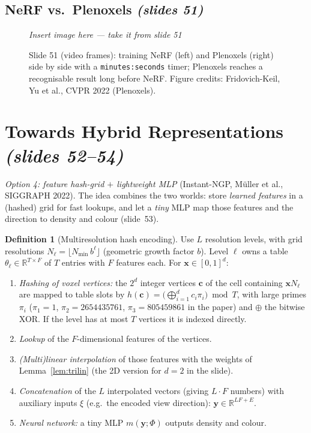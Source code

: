 \documentclass[11pt,a4paper]{article}
\newcommand{\R}{\mathbb{R}}
\newcommand{\xx}{\boldsymbol{x}}
\newcommand{\sref}[1]{\texorpdfstring{\emph{(slides #1)}}{(slides #1)}}
\theoremstyle{definition}
\newtheorem{definition}{Definition}[section]
\theoremstyle{plain}
\newcommand{\slideimg}[3]{%
\begin{figure}[H]
\centering
\begin{tcolorbox}[enhanced,colback=white,colframe=white,boxrule=0pt,sharp corners,overlay={\draw[dashed,gray,thick] (frame.south west) rectangle (frame.north east);},
  width=0.92\linewidth,height=#2,valign=center,halign=center]
{\color{gray}\itshape Insert image here --- take it from slide #1}
\end{tcolorbox}
\caption{#3}
\end{figure}}
\begin{document}
\subsection{NeRF vs.\ Plenoxels \sref{51}}

\slideimg{51}{4.8cm}{Slide 51 (video frames): training NeRF (left) and Plenoxels (right) side by side with a \texttt{minutes:seconds} timer; Plenoxels reaches a recognisable result long before NeRF. Figure credits: Fridovich-Keil, Yu et al., CVPR 2022 (Plenoxels).}

\section{Towards Hybrid Representations \sref{52--54}}

\emph{Option 4: feature hash-grid $+$ lightweight MLP} (Instant-NGP, M\"uller et al., SIGGRAPH 2022). The idea combines the two worlds: store \emph{learned features} in a (hashed) grid for fast lookups, and let a \emph{tiny} MLP map those features and the direction to density and colour (slide~53).

\begin{definition}[Multiresolution hash encoding]\label{def:hash}
Use $L$ resolution levels, with grid resolutions $N_\ell=\lfloor N_{\min}\,b^{\ell}\rfloor$ (geometric growth factor $b$). Level $\ell$ owns a table $\theta_\ell\in\R^{T\times F}$ of $T$ entries with $F$ features each. For $\xx\in[0,1]^d$:
\begin{enumerate}[nosep]
\item \emph{Hashing of voxel vertices:} the $2^d$ integer vertices $\boldsymbol c$ of the cell containing $\xx N_\ell$ are mapped to table slots by $h(\boldsymbol c)=\big(\bigoplus_{i=1}^dc_i\pi_i\big)\bmod T$, with large primes $\pi_i$ ($\pi_1=1$, $\pi_2=2654435761$, $\pi_3=805459861$ in the paper) and $\oplus$ the bitwise XOR. If the level has at most $T$ vertices it is indexed directly.
\item \emph{Lookup} of the $F$-dimensional features of the vertices.
\item \emph{(Multi)linear interpolation} of those features with the weights of Lemma~\ref{lem:trilin} (the 2D version for $d=2$ in the slide).
\item \emph{Concatenation} of the $L$ interpolated vectors (giving $L\cdot F$ numbers) with auxiliary inputs $\xi$ (e.g.\ the encoded view direction): $\boldsymbol y\in\R^{LF+E}$.
\item \emph{Neural network:} a tiny MLP $m(\boldsymbol y;\Phi)$ outputs density and colour.
\end{enumerate}
\end{definition}
\end{document}

